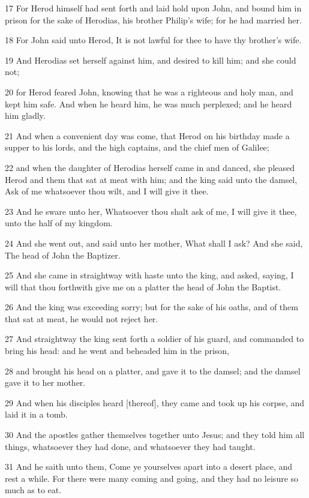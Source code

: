 \par 17 For Herod himself had sent forth and laid hold upon John, and bound him in prison for the sake of Herodias, his brother Philip's wife; for he had married her.
\par 18 For John said unto Herod, It is not lawful for thee to have thy brother's wife.
\par 19 And Herodias set herself against him, and desired to kill him; and she could not;
\par 20 for Herod feared John, knowing that he was a righteous and holy man, and kept him safe. And when he heard him, he was much perplexed; and he heard him gladly.
\par 21 And when a convenient day was come, that Herod on his birthday made a supper to his lords, and the high captains, and the chief men of Galilee;
\par 22 and when the daughter of Herodias herself came in and danced, she pleased Herod and them that sat at meat with him; and the king said unto the damsel, Ask of me whatsoever thou wilt, and I will give it thee.
\par 23 And he sware unto her, Whatsoever thou shalt ask of me, I will give it thee, unto the half of my kingdom.
\par 24 And she went out, and said unto her mother, What shall I ask? And she said, The head of John the Baptizer.
\par 25 And she came in straightway with haste unto the king, and asked, saying, I will that thou forthwith give me on a platter the head of John the Baptist.
\par 26 And the king was exceeding sorry; but for the sake of his oaths, and of them that sat at meat, he would not reject her.
\par 27 And straightway the king sent forth a soldier of his guard, and commanded to bring his head: and he went and beheaded him in the prison,
\par 28 and brought his head on a platter, and gave it to the damsel; and the damsel gave it to her mother.
\par 29 And when his disciples heard [thereof], they came and took up his corpse, and laid it in a tomb.
\par 30 And the apostles gather themselves together unto Jesus; and they told him all things, whatsoever they had done, and whatsoever they had taught.
\par 31 And he saith unto them, Come ye yourselves apart into a desert place, and rest a while. For there were many coming and going, and they had no leisure so much as to eat.
